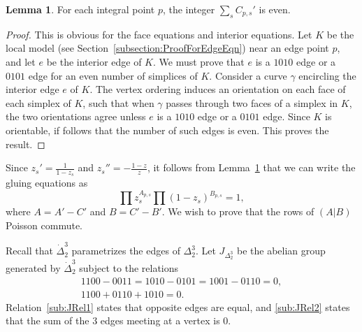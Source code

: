 \documentclass[12pt]{amsart}
\theoremstyle{definition}
\newtheorem{lemma}[theorem]{Lemma}
\numberwithin{equation}{section}
\begin{document}
\begin{lemma}\label{lemma:Even}
For each integral point $p$, the integer $\sum_s C_{p,s}'$ is even.
\end{lemma}
\begin{proof}
This is obvious for the face equations and interior equations. Let $K$ be the local model (see Section~\ref{subsection:ProofForEdgeEqn}) near an edge point $p$, and let $e$ be the interior edge of $K$. We must prove that $e$ is a $1010$ edge or a $0101$ edge for an even number of simplices of $K$. Consider a curve $\gamma$ encircling the interior edge $e$ of $K$. The vertex ordering induces an orientation on each face of each simplex of $K$, such that when $\gamma$ passes through two faces of a simplex in $K$, the two orientations agree unless $e$ is a $1010$ edge or a $0101$ edge. Since $K$ is orientable, if follows that the number of such edges is even. This proves the result.
\end{proof}

Since $z_s'=\frac{1}{1-z_s}$ and $z_s''=-\frac{1-z}{z}$, it follows from Lemma~\ref{lemma:Even} that we can write the gluing equations as
\begin{equation}\label{eq:Simplified}
\prod z_s^{A_{p,s}}\prod (1-z_s)^{B_{p,s}}=1,
\end{equation}
where $A=A'-C'$ and $B=C'-B'$. We wish to prove that the rows of $(A\vert B)$ Poisson commute.

Recall that $\dot\Delta_2^3$ parametrizes the edges of $\Delta^3_2$. Let $J_{\Delta^3_2}$ be the abelian group generated by $\dot\Delta_2^3$ subject to the relations
\begin{subequations}\label{eq:JRelation}
\begin{gather}
1100-0011=1010-0101=1001-0110=0\label{sub:JRel1},\\
1100+0110+1010=0\label{sub:JRel2}.
\end{gather}
\end{subequations}
Relation~\eqref{sub:JRel1} states that opposite edges are equal, and \eqref{sub:JRel2} states that the sum of the $3$ edges meeting at a vertex is $0$.
\end{document}
